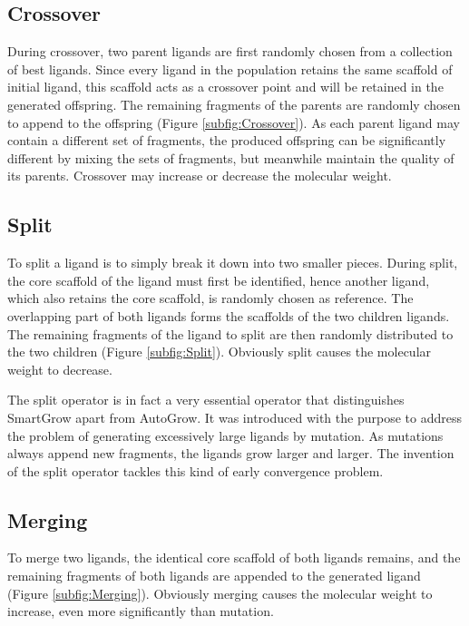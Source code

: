 \subsection{Crossover}

During crossover, two parent ligands are first randomly chosen from a collection of best ligands. Since every ligand in the population retains the same scaffold of initial ligand, this scaffold acts as a crossover point and will be retained in the generated offspring. The remaining fragments of the parents are randomly chosen to append to the offspring (Figure \ref{subfig:Crossover}). As each parent ligand may contain a different set of fragments, the produced offspring can be significantly different by mixing the sets of fragments, but meanwhile maintain the quality of its parents. Crossover may increase or decrease the molecular weight.

\subsection{Split}

To split a ligand is to simply break it down into two smaller pieces. During split, the core scaffold of the ligand must first be identified, hence another ligand, which also retains the core scaffold, is randomly chosen as reference. The overlapping part of both ligands forms the scaffolds of the two children ligands. The remaining fragments of the ligand to split are then randomly distributed to the two children (Figure \ref{subfig:Split}). Obviously split causes the molecular weight to decrease.

The split operator is in fact a very essential operator that distinguishes SmartGrow apart from AutoGrow. It was introduced with the purpose to address the problem of generating excessively large ligands by mutation. As mutations always append new fragments, the ligands grow larger and larger. The invention of the split operator tackles this kind of early convergence problem.

\subsection{Merging}

To merge two ligands, the identical core scaffold of both ligands remains, and the remaining fragments of both ligands are appended to the generated ligand (Figure \ref{subfig:Merging}). Obviously merging causes the molecular weight to increase, even more significantly than mutation.

